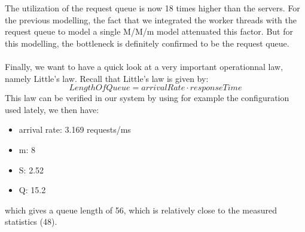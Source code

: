\documentclass[11pt,a4paper]{article}
\begin{document}
 The utilization of the request queue is now 18 times higher than the servers. For the previous modelling, the fact that we integrated the worker threads with the request queue to model a single M/M/m model attenuated this factor. But for this modelling, the bottleneck is definitely confirmed to be the request queue. 
 \\
 \\
 Finally, we want to have a quick look at a very important operationnal law, namely Little's law. Recall that Little's law is given by: 
 \[Length Of Queue = arrival Rate \cdot response Time\]
 This law can be verified in our system by using for example the configuration used lately, we then have:
 \begin{itemize}
\item arrival rate: 3.169 requests/ms
\item m: 8
\item S: 2.52 
\item Q: 15.2
\end{itemize}
which gives a queue length of 56, which is relatively close to the measured statistics (48). 
 
 
\end{document}

